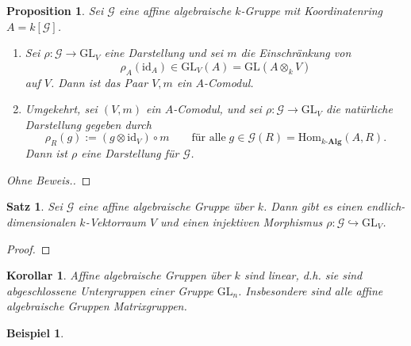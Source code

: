 \documentclass[a4paper, 11pt]{scrartcl}
\newcommand{\Hom}{\text{Hom}}
\newcommand{\id}{\text{id}}
\theoremstyle{basicstyle}
\newtheorem{beispiel}[definition]{Beispiel}
\newtheorem{korollar}[definition]{Korollar}
\newtheorem{satz}[definition]{Satz}
\newtheorem{proposition}[definition]{Proposition}
\begin{document}
    \begin{proposition}
        Sei \(\mathcal{G}\) eine affine algebraische \(k\)-Gruppe mit Koordinatenring \(A = k[\mathcal{G}]\).
        \begin{enumerate}
            \item Sei \(\rho : \mathcal{G} \to \text{GL}_V\) eine Darstellung und sei \(m\) die Einschränkung von
                \[\rho_A(\id_A) \in \text{GL}_V(A) = \text{GL}(A \otimes_k V)\]
                auf \(V\).
                Dann ist das Paar \(V, m\) ein \(A\)-Comodul.

            \item Umgekehrt, sei \((V, m)\) ein \(A\)-Comodul, und sei \(\rho: \mathcal{G} \to \text{GL}_V\) die \emph{natürliche Darstellung} gegeben durch
                \[\rho_R(g) := (g \otimes \id_V) \circ m \qquad \text{für alle}\; g \in \mathcal{G}(R) = \Hom_{k\textbf{-Alg}}(A, R).\]
                Dann ist \(\rho\) eine Darstellung für \(\mathcal{G}\).
        \end{enumerate}
    \end{proposition}
    \begin{proof}[Ohne Beweis.]
    \end{proof}
    
    \begin{satz}
        Sei \(\mathcal{G}\) eine affine algebraische Gruppe über \(k\).
        Dann gibt es einen endlich-dimensionalen \(k\)-Vektorraum \(V\) und einen injektiven Morphismus \(\rho: \mathcal{G} \hookrightarrow \text{GL}_V\).
    \end{satz}
    \begin{proof}
        
    \end{proof}

    \begin{korollar}
        Affine algebraische Gruppen über \(k\) sind linear, d.h. sie sind abgeschlossene Untergruppen einer Gruppe \(\text{GL}_n\).
        Insbesondere sind alle affine algebraische Gruppen Matrixgruppen.
    \end{korollar}

    \begin{beispiel}
        
    \end{beispiel}
\end{document}
